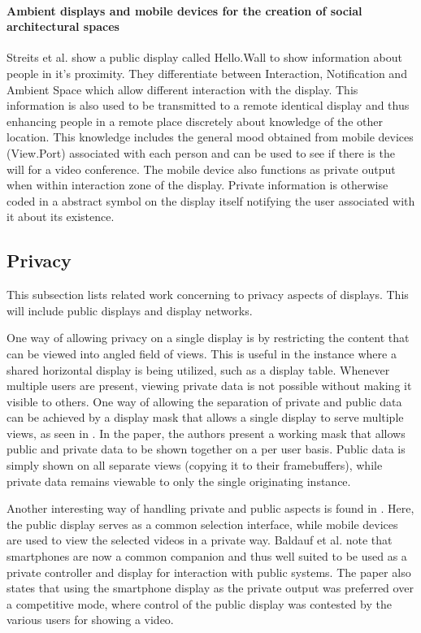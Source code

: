 \paragraph{Ambient displays and mobile devices for the creation of social architectural spaces}
Streits et al. \cite{streitz_ambient_2003} show a public display called Hello.Wall to show information about people in it's proximity.
They differentiate between Interaction, Notification and Ambient Space which allow different interaction with the display.
This information is also used to be transmitted to a remote identical display and thus enhancing people in a remote place discretely about knowledge of the other location.
This knowledge includes the general mood obtained from mobile devices (View.Port) associated with each person and can be used to see if there is the will for a video conference.
The mobile device also functions as private output when within interaction zone of the display.
Private information is otherwise coded in a abstract symbol on the display itself notifying the user associated with it about its existence.

\subsection{Privacy}

This subsection lists related work concerning to privacy aspects of displays.
This will include public displays and display networks.

One way of allowing privacy on a single display is by restricting the content that can be viewed into angled field of views.
This is useful in the instance where a shared horizontal display is being utilized, such as a display table.
Whenever multiple users are present, viewing private data is not possible without making it visible to others.
One way of allowing the separation of private and public data can be achieved by a display mask that allows a single display to serve multiple views, as seen in \cite{smith2008public}.
In the paper, the authors present a working mask that allows public and private data to be shown together on a per user basis.
Public data is simply shown on all separate views (copying it to their framebuffers), while private data remains viewable to only the single originating instance.

Another interesting way of handling private and public aspects is found in \cite{baldauf2012private}.
Here, the public display serves as a common selection interface, while mobile devices are used to view the selected videos in a private way.
Baldauf et al. note that smartphones are now a common companion and thus well suited to be used as a private controller and display for interaction with public systems.
The paper also states that using the smartphone display as the private output was preferred over a competitive mode, where control of the public display was contested by the various users for showing a video.


